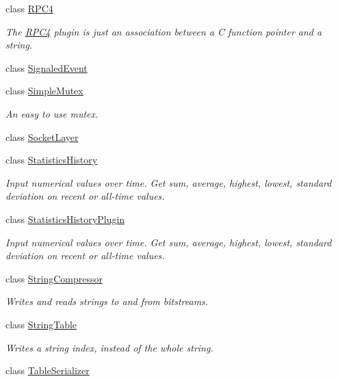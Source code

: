 \begin{DoxyCompactItemize}
class \hyperlink{class_rak_net_1_1_r_p_c4}{R\-P\-C4}
\begin{DoxyCompactList}\small\item\em The \hyperlink{class_rak_net_1_1_r_p_c4}{R\-P\-C4} plugin is just an association between a C function pointer and a string. \end{DoxyCompactList}\item 
class \hyperlink{class_rak_net_1_1_signaled_event}{Signaled\-Event}
\item 
class \hyperlink{class_rak_net_1_1_simple_mutex}{Simple\-Mutex}
\begin{DoxyCompactList}\small\item\em An easy to use mutex. \end{DoxyCompactList}\item 
class \hyperlink{class_rak_net_1_1_socket_layer}{Socket\-Layer}
\item 
class \hyperlink{class_rak_net_1_1_statistics_history}{Statistics\-History}
\begin{DoxyCompactList}\small\item\em Input numerical values over time. Get sum, average, highest, lowest, standard deviation on recent or all-\/time values. \end{DoxyCompactList}\item 
class \hyperlink{class_rak_net_1_1_statistics_history_plugin}{Statistics\-History\-Plugin}
\begin{DoxyCompactList}\small\item\em Input numerical values over time. Get sum, average, highest, lowest, standard deviation on recent or all-\/time values. \end{DoxyCompactList}\item 
class \hyperlink{class_rak_net_1_1_string_compressor}{String\-Compressor}
\begin{DoxyCompactList}\small\item\em Writes and reads strings to and from bitstreams. \end{DoxyCompactList}\item 
class \hyperlink{class_rak_net_1_1_string_table}{String\-Table}
\begin{DoxyCompactList}\small\item\em Writes a string index, instead of the whole string. \end{DoxyCompactList}\item 
class \hyperlink{class_rak_net_1_1_table_serializer}{Table\-Serializer}
\item 

\end{DoxyCompactItemize}
